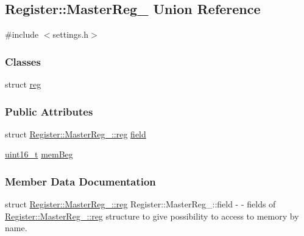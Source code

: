 \hypertarget{unionRegister_1_1MasterReg__}{}\subsection{Register\+:\+:Master\+Reg\+\_\+ Union Reference}
\label{unionRegister_1_1MasterReg__}


{\ttfamily \#include $<$settings.\+h$>$}

\subsubsection*{Classes}
\begin{DoxyCompactItemize}
\item 
struct \mbox{\hyperlink{structRegister_1_1MasterReg___1_1reg}{reg}}
\end{DoxyCompactItemize}
\subsubsection*{Public Attributes}
\begin{DoxyCompactItemize}
\item 
struct \mbox{\hyperlink{structRegister_1_1MasterReg___1_1reg}{Register\+::\+Master\+Reg\+\_\+\+::reg}} \mbox{\hyperlink{unionRegister_1_1MasterReg___a2ce41177efcf552017932e960368689a}{field}}
\item 
\mbox{\hyperlink{settings_8h_a017dd44e68049ffdd31500a8cd01ba68}{uint16\+\_\+t}} \mbox{\hyperlink{unionRegister_1_1MasterReg___a1753a4e5fb7c7ea404794200f06844d0}{mem\+Beg}}
\end{DoxyCompactItemize}


\subsubsection{Member Data Documentation}
\mbox{\label{unionRegister_1_1MasterReg___a2ce41177efcf552017932e960368689a}} 
{\footnotesize\ttfamily struct \mbox{\hyperlink{structRegister_1_1MasterReg___1_1reg}{Register\+::\+Master\+Reg\+\_\+\+::reg}} Register\+::\+Master\+Reg\+\_\+\+::\texorpdfstring{field}{field}} - - fields of \mbox{\hyperlink{structRegister_1_1MasterReg___1_1reg}{Register\+::\+Master\+Reg\+\_\+\+::reg}} structure to give possibility to access to memory by name.

